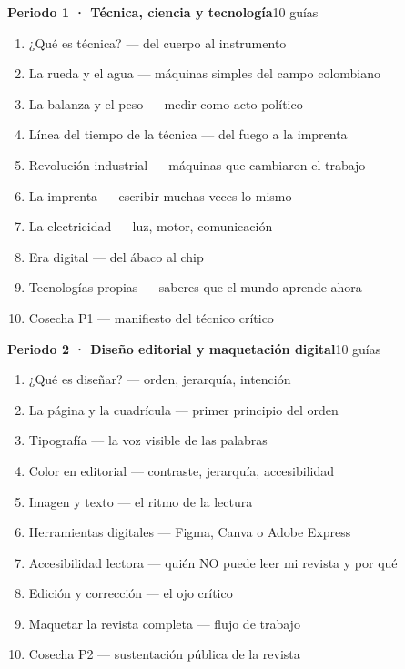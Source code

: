 \bigskip
{}
\vspace{1pt}\par\noindent{\color{vinoInst}\rule{\textwidth}{1pt}}
\vspace{3pt}

\noindent\textbf{Periodo 1 · Técnica, ciencia y tecnología}\hfill{\footnotesize\color{vinoInst}10 guías}\par
\begin{enumerate}[leftmargin=2.6em, itemsep=0.6pt, topsep=2pt, parsep=0pt, label=\footnotesize\arabic*.]
\footnotesize
  \item ¿Qué es técnica? --- del cuerpo al instrumento
  \item La rueda y el agua --- máquinas simples del campo colombiano
  \item La balanza y el peso --- medir como acto político
  \item Línea del tiempo de la técnica --- del fuego a la imprenta
  \item Revolución industrial --- máquinas que cambiaron el trabajo
  \item La imprenta --- escribir muchas veces lo mismo
  \item La electricidad --- luz, motor, comunicación
  \item Era digital --- del ábaco al chip
  \item Tecnologías propias --- saberes que el mundo aprende ahora
  \item Cosecha P1 --- manifiesto del técnico crítico
\end{enumerate}

\noindent\textbf{Periodo 2 · Diseño editorial y maquetación digital}\hfill{\footnotesize\color{vinoInst}10 guías}\par
\begin{enumerate}[leftmargin=2.6em, itemsep=0.6pt, topsep=2pt, parsep=0pt, label=\footnotesize\arabic*.]
\footnotesize
  \item ¿Qué es diseñar? --- orden, jerarquía, intención
  \item La página y la cuadrícula --- primer principio del orden
  \item Tipografía --- la voz visible de las palabras
  \item Color en editorial --- contraste, jerarquía, accesibilidad
  \item Imagen y texto --- el ritmo de la lectura
  \item Herramientas digitales --- Figma, Canva o Adobe Express
  \item Accesibilidad lectora --- quién NO puede leer mi revista y por qué
  \item Edición y corrección --- el ojo crítico
  \item Maquetar la revista completa --- flujo de trabajo
  \item Cosecha P2 --- sustentación pública de la revista
\end{enumerate}

